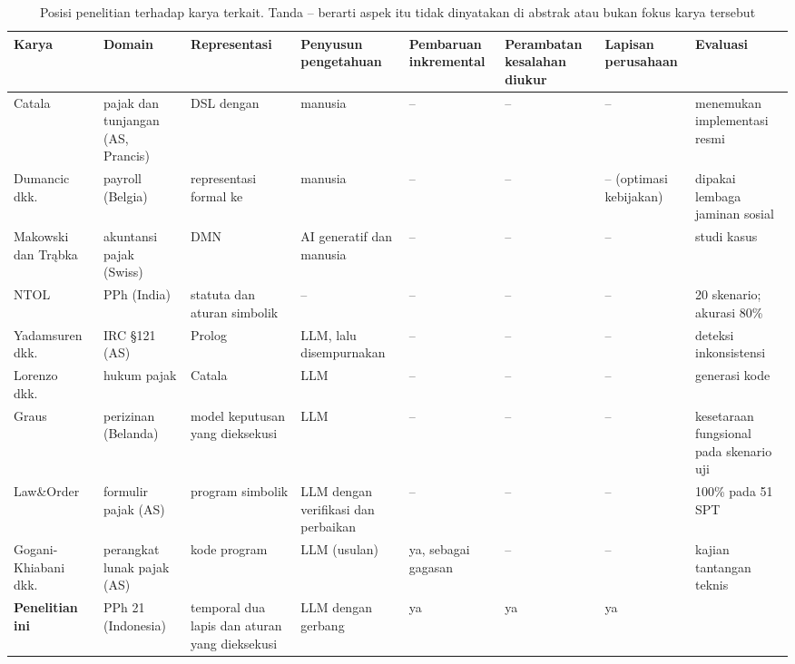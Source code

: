 \begin{table}[t]
\centering
\caption{Posisi penelitian terhadap karya terkait. Tanda -- berarti aspek itu tidak dinyatakan di abstrak atau bukan fokus karya tersebut}
\label{tab:posisi}
\scriptsize
\begin{tabularx}{\textwidth}{@{}P{2.6cm} P{1.9cm} L P{1.9cm} P{1.6cm} P{1.5cm} P{1.4cm} P{2.3cm}@{}}
\toprule
\textbf{Karya} & \textbf{Domain} & \textbf{Representasi} & \textbf{Penyusun pengetahuan} & \textbf{Pembaruan inkremental} & \textbf{Perambatan kesalahan diukur} & \textbf{Lapisan perusahaan} & \textbf{Evaluasi} \\
\midrule
Catala~\cite{merigoux2021catala} & pajak dan tunjangan (AS, Prancis) & DSL dengan  & manusia & -- & -- & -- & menemukan  implementasi resmi \\
Dumancic dkk.~\cite{dumancic2021payroll} & payroll (Belgia) & representasi formal ke  & manusia & -- & -- & -- (optimasi kebijakan) & dipakai lembaga jaminan sosial \\
Makowski dan Tr\k{a}bka~\cite{makowski2025dmn} & akuntansi pajak (Swiss) & DMN & AI generatif dan manusia & -- & -- & -- & studi kasus \\
NTOL~\cite{veeramani2026neurosymbolic} & PPh (India) &  statuta dan aturan simbolik & -- & -- & -- & -- & 20 skenario; akurasi 80\% \\
Yadamsuren dkk.~\cite{yadamsuren2026formalization} & IRC \S121 (AS) & Prolog & LLM, lalu disempurnakan & -- & -- & -- & deteksi inkonsistensi \\
Lorenzo dkk.~\cite{lorenzo2025translating} & hukum pajak & Catala & LLM & -- & -- & -- &  generasi kode \\
Graus~\cite{graus2026executable} & perizinan (Belanda) & model keputusan yang dieksekusi & LLM & -- & -- & -- & kesetaraan fungsional pada skenario uji \\
Law\&Order~\cite{han2026autoformalization} & formulir pajak (AS) & program simbolik & LLM dengan verifikasi dan perbaikan & -- & -- & -- & 100\% pada 51 SPT  \\
Gogani-Khiabani dkk.~\cite{goganikhiabani2025maintaining} & perangkat lunak pajak (AS) & kode program & LLM (usulan) & ya, sebagai gagasan & -- & -- & kajian tantangan teknis \\
\midrule
\textbf{Penelitian ini} & PPh 21 (Indonesia) &  temporal dua lapis dan aturan yang dieksekusi & LLM dengan gerbang & ya & ya & ya &  \\
\bottomrule
\end{tabularx}
\end{table}

